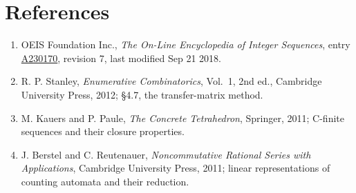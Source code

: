 \documentclass[11pt]{article}
\theoremstyle{definition}
\begin{document}
\section{References}

\begin{enumerate}

\item OEIS Foundation Inc., \emph{The On-Line Encyclopedia of Integer Sequences}, entry \href{https://oeis.org/A230170}{A230170}, revision 7, last modified Sep 21 2018.

\item R. P. Stanley, \emph{Enumerative Combinatorics}, Vol.~1, 2nd ed., Cambridge University Press, 2012; \S4.7, the transfer-matrix method.

\item M. Kauers and P. Paule, \emph{The Concrete Tetrahedron}, Springer, 2011; C-finite sequences and their closure properties.

\item J. Berstel and C. Reutenauer, \emph{Noncommutative Rational Series with Applications}, Cambridge University Press, 2011; linear representations of counting automata and their reduction.

\end{enumerate}
\end{document}
